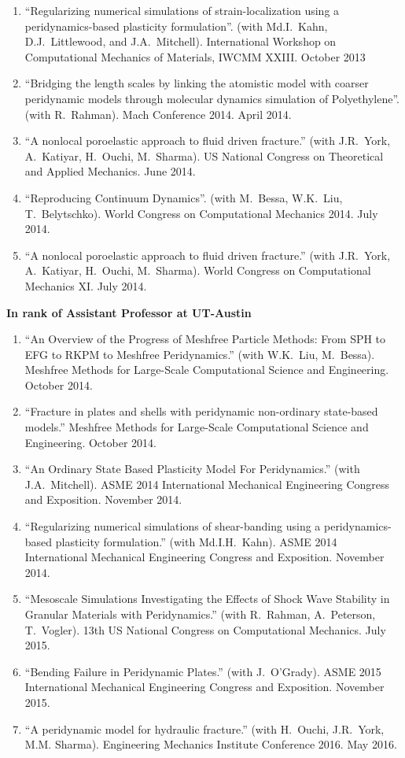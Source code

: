 \begin{enumerate}[resume]
    \item ``Regularizing numerical simulations of strain-localization using a peridynamics-based plasticity formulation''. (with Md.I.~Kahn, D.J.~Littlewood, and J.A.~Mitchell). International Workshop on Computational Mechanics of Materials, IWCMM XXIII. October 2013
    \item ``Bridging the length scales by linking the atomistic model with coarser peridynamic models through molecular dynamics simulation of Polyethylene''. (with R.~Rahman). Mach Conference 2014.  April 2014.
    \item ``A nonlocal poroelastic approach to fluid driven fracture.'' (with J.R.~York, A.~Katiyar, H.~Ouchi, M.~Sharma). US National Congress on Theoretical and Applied Mechanics.  June 2014.
    \item ``Reproducing Continuum Dynamics''. (with M.~Bessa, W.K.~Liu, T.~Belytschko). World Congress on Computational Mechanics 2014.  July 2014.
    \item ``A nonlocal poroelastic approach to fluid driven fracture.'' (with J.R.~York, A.~Katiyar, H.~Ouchi, M.~Sharma). World Congress on Computational Mechanics XI.  July 2014.
\end{enumerate}
    \pagebreak[2]
    \textbf{In rank of Assistant Professor at UT-Austin}
\begin{enumerate}[resume]
    \item ``An Overview of the Progress of Meshfree Particle Methods: From SPH to EFG to RKPM to Meshfree Peridynamics.'' (with W.K.~Liu, M.~Bessa). Meshfree Methods for Large-Scale Computational Science and Engineering. October 2014.
    \item ``Fracture in plates and shells with peridynamic non-ordinary state-based models.''  Meshfree Methods for Large-Scale Computational Science and Engineering. October 2014.
    \item ``An Ordinary State Based Plasticity Model For Peridynamics.'' (with J.A.~Mitchell). ASME 2014 International Mechanical Engineering Congress and Exposition. November 2014.
    \item ``Regularizing numerical simulations of shear-banding using a peridynamics-based plasticity formulation.'' (with Md.I.H.~Kahn). ASME 2014 International Mechanical Engineering Congress and Exposition. November 2014.
    \item ``Mesoscale Simulations Investigating the Effects of Shock Wave Stability in Granular Materials with Peridynamics.'' (with R.~Rahman, A.~Peterson, T.~Vogler). 13th US National Congress on Computational Mechanics. July 2015.
    \item ``Bending Failure in Peridynamic Plates.'' (with J.~O'Grady). ASME 2015 International Mechanical Engineering Congress and Exposition. November 2015.
    \item ``A peridynamic model for hydraulic fracture.'' (with H.\ Ouchi, J.R.\ York, M.M. Sharma). Engineering Mechanics Institute Conference 2016. May 2016.
\end{enumerate}
